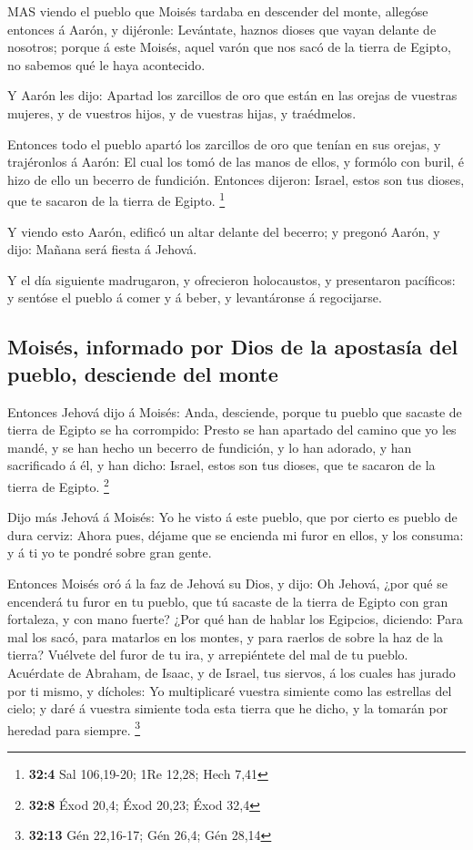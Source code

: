  MAS viendo el pueblo que Moisés tardaba en descender del
monte, allegóse entonces á Aarón, y dijéronle: Levántate, haznos dioses
que vayan delante de nosotros; porque á este Moisés, aquel varón que nos
sacó de la tierra de Egipto, no sabemos qué le haya acontecido.

 Y Aarón les dijo: Apartad los zarcillos de oro que están en
las orejas de vuestras mujeres, y de vuestros hijos, y de vuestras
hijas, y traédmelos.

 Entonces todo el pueblo apartó los zarcillos de oro que
tenían en sus orejas, y trajéronlos á Aarón:  El cual los
tomó de las manos de ellos, y formólo con buril, é hizo de ello un
becerro de fundición. Entonces dijeron: Israel, estos son tus dioses,
que te sacaron de la tierra de Egipto. \footnote{\textbf{32:4} Sal
  106,19-20; 1Re 12,28; Hech 7,41}

 Y viendo esto Aarón, edificó un altar delante del becerro;
y pregonó Aarón, y dijo: Mañana será fiesta á Jehová.

 Y el día siguiente madrugaron, y ofrecieron holocaustos, y
presentaron pacíficos: y sentóse el pueblo á comer y á beber, y
levantáronse á regocijarse.

\hypertarget{moisuxe9s-informado-por-dios-de-la-apostasuxeda-del-pueblo-desciende-del-monte}{%
\subsection{Moisés, informado por Dios de la apostasía del pueblo,
desciende del
monte}\label{moisuxe9s-informado-por-dios-de-la-apostasuxeda-del-pueblo-desciende-del-monte}}

 Entonces Jehová dijo á Moisés: Anda, desciende, porque tu
pueblo que sacaste de tierra de Egipto se ha corrompido: 
Presto se han apartado del camino que yo les mandé, y se han hecho un
becerro de fundición, y lo han adorado, y han sacrificado á él, y han
dicho: Israel, estos son tus dioses, que te sacaron de la tierra de
Egipto. \footnote{\textbf{32:8} Éxod 20,4; Éxod 20,23; Éxod 32,4}

 Dijo más Jehová á Moisés: Yo he visto á este pueblo, que
por cierto es pueblo de dura cerviz:  Ahora pues, déjame
que se encienda mi furor en ellos, y los consuma: y á ti yo te pondré
sobre gran gente.

 Entonces Moisés oró á la faz de Jehová su Dios, y dijo: Oh
Jehová, ¿por qué se encenderá tu furor en tu pueblo, que tú sacaste de
la tierra de Egipto con gran fortaleza, y con mano fuerte? 
¿Por qué han de hablar los Egipcios, diciendo: Para mal los sacó, para
matarlos en los montes, y para raerlos de sobre la haz de la tierra?
Vuélvete del furor de tu ira, y arrepiéntete del mal de tu pueblo.
 Acuérdate de Abraham, de Isaac, y de Israel, tus siervos,
á los cuales has jurado por ti mismo, y dícholes: Yo multiplicaré
vuestra simiente como las estrellas del cielo; y daré á vuestra simiente
toda esta tierra que he dicho, y la tomarán por heredad para siempre.
\footnote{\textbf{32:13} Gén 22,16-17; Gén 26,4; Gén 28,14}

